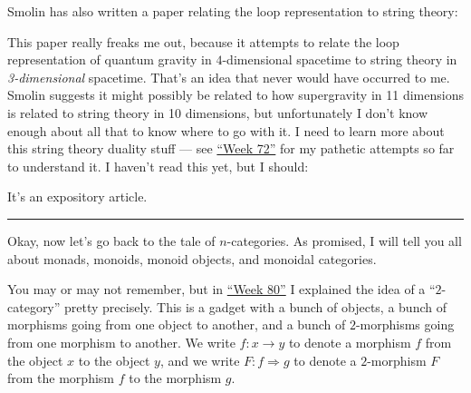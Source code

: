 \documentclass{article}
\def\tightlist{}
\renewcommand{\texttt}[1]{%
  \begingroup
  \ttfamily
  \begingroup\lccode`~=`/\lowercase{\endgroup\def~}{/\discretionary{}{}{}}%
  \begingroup\lccode`~=`[\lowercase{\endgroup\def~}{[\discretionary{}{}{}}%
  \begingroup\lccode`~=`.\lowercase{\endgroup\def~}{.\discretionary{}{}{}}%
  \catcode`/=\active\catcode`[=\active\catcode`.=\active
  \scantokens{#1\noexpand}%
  \endgroup
}
\begin{document}
Smolin has also written a paper relating the loop representation to
string theory:


This paper really freaks me out, because it attempts to relate the loop
representation of quantum gravity in \(4\)-dimensional spacetime to
string theory in \emph{3-dimensional} spacetime. That's an idea that
never would have occurred to me. Smolin suggests it might possibly be
related to how supergravity in 11 dimensions is related to string theory
in 10 dimensions, but unfortunately I don't know enough about all that
to know where to go with it. I need to learn more about this string
theory duality stuff --- see \protect\hyperlink{week72}{``Week 72''} for
my pathetic attempts so far to understand it. I haven't read this yet,
but I should:


It's an expository article.

\begin{center}\rule{0.5\linewidth}{0.5pt}\end{center}

Okay, now let's go back to the tale of \(n\)-categories. As promised, I
will tell you all about monads, monoids, monoid objects, and monoidal
categories.

You may or may not remember, but in \protect\hyperlink{week80}{``Week
80''} I explained the idea of a ``\(2\)-category'' pretty precisely.
This is a gadget with a bunch of objects, a bunch of morphisms going
from one object to another, and a bunch of \(2\)-morphisms going from
one morphism to another. We write \(f\colon x\to y\) to denote a
morphism \(f\) from the object \(x\) to the object \(y\), and we write
\(F\colon f\Rightarrow g\) to denote a \(2\)-morphism \(F\) from the
morphism \(f\) to the morphism \(g\).
\end{document}
